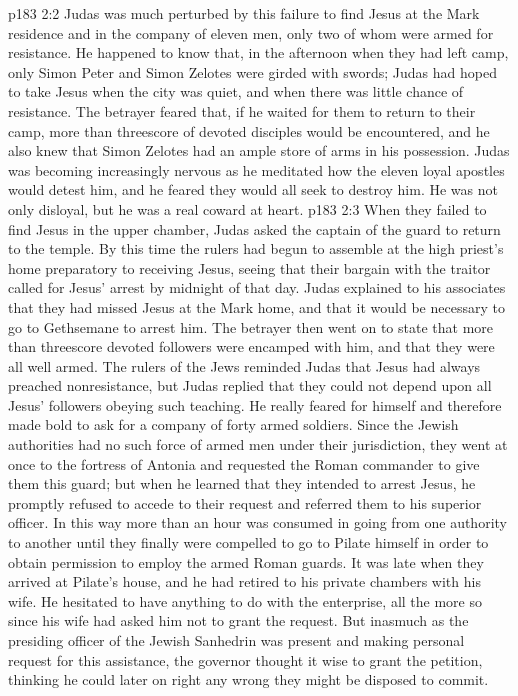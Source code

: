 \vs p183 2:2 Judas was much perturbed by this failure to find Jesus at the Mark residence and in the company of eleven men, only two of whom were armed for resistance. He happened to know that, in the afternoon when they had left camp, only Simon Peter and Simon Zelotes were girded with swords; Judas had hoped to take Jesus when the city was quiet, and when there was little chance of resistance. The betrayer feared that, if he waited for them to return to their camp, more than threescore of devoted disciples would be encountered, and he also knew that Simon Zelotes had an ample store of arms in his possession. Judas was becoming increasingly nervous as he meditated how the eleven loyal apostles would detest him, and he feared they would all seek to destroy him. He was not only disloyal, but he was a real coward at heart.
\vs p183 2:3 When they failed to find Jesus in the upper chamber, Judas asked the captain of the guard to return to the temple. By this time the rulers had begun to assemble at the high priest’s home preparatory to receiving Jesus, seeing that their bargain with the traitor called for Jesus’ arrest by midnight of that day. Judas explained to his associates that they had missed Jesus at the Mark home, and that it would be necessary to go to Gethsemane to arrest him. The betrayer then went on to state that more than threescore devoted followers were encamped with him, and that they were all well armed. The rulers of the Jews reminded Judas that Jesus had always preached nonresistance, but Judas replied that they could not depend upon all Jesus’ followers obeying such teaching. He really feared for himself and therefore made bold to ask for a company of forty armed soldiers. Since the Jewish authorities had no such force of armed men under their jurisdiction, they went at once to the fortress of Antonia and requested the Roman commander to give them this guard; but when he learned that they intended to arrest Jesus, he promptly refused to accede to their request and referred them to his superior officer. In this way more than an hour was consumed in going from one authority to another until they finally were compelled to go to Pilate himself in order to obtain permission to employ the armed Roman guards. It was late when they arrived at Pilate’s house, and he had retired to his private chambers with his wife. He hesitated to have anything to do with the enterprise, all the more so since his wife had asked him not to grant the request. But inasmuch as the presiding officer of the Jewish Sanhedrin was present and making personal request for this assistance, the governor thought it wise to grant the petition, thinking he could later on right any wrong they might be disposed to commit.\plusone
